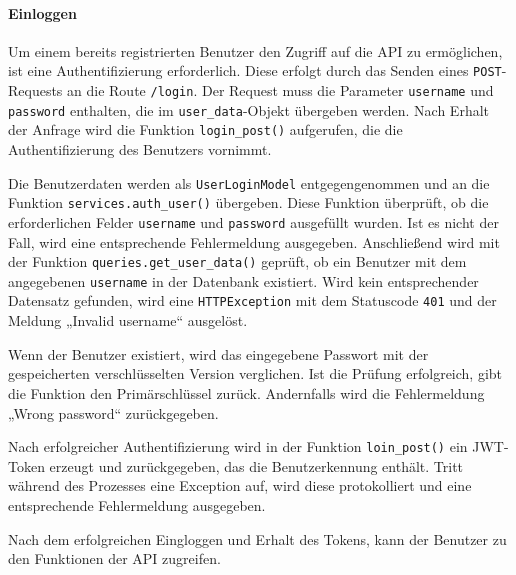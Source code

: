 \documentclass[12pt, letterpaper]{article}
\begin{document}
  \paragraph{Einloggen}
  \par Um einem bereits registrierten Benutzer den Zugriff auf die API zu ermöglichen, ist eine Authentifizierung erforderlich. Diese erfolgt durch das Senden eines \texttt{POST}-Requests an die Route \texttt{/login}. Der Request muss die Parameter \texttt{username} und \texttt{password} enthalten, die im \texttt{user\_data}-Objekt übergeben werden. Nach Erhalt der Anfrage wird die Funktion \texttt{login\_post()} aufgerufen, die die Authentifizierung des Benutzers vornimmt.
  \par Die Benutzerdaten werden als \texttt{UserLoginModel} entgegengenommen und an die Funktion \texttt{services.auth\_user()} übergeben. Diese Funktion überprüft, ob die erforderlichen Felder \texttt{username} und \texttt{password} ausgefüllt wurden. Ist es nicht der Fall, wird eine entsprechende Fehlermeldung ausgegeben. Anschließend wird mit der Funktion \texttt{queries.get\_user\_data()} geprüft, ob ein Benutzer mit dem angegebenen \texttt{username} in der Datenbank existiert. Wird kein entsprechender Datensatz gefunden, wird eine \texttt{HTTPException} mit dem Statuscode \texttt{401} und der Meldung „Invalid username“ ausgelöst.
  \par Wenn der Benutzer existiert, wird das eingegebene Passwort mit der gespeicherten verschlüsselten Version verglichen. Ist die Prüfung erfolgreich, gibt die Funktion den Primärschlüssel zurück. Andernfalls wird die Fehlermeldung „Wrong password“ zurückgegeben.
  \par Nach erfolgreicher Authentifizierung wird in der Funktion \texttt{loin\_post()} ein JWT-Token erzeugt und zurückgegeben, das die Benutzerkennung enthält. Tritt während des Prozesses eine Exception auf, wird diese protokolliert und eine entsprechende Fehlermeldung ausgegeben.
  \par Nach dem erfolgreichen Eingloggen und Erhalt des Tokens, kann der Benutzer zu den Funktionen der API zugreifen. 
\end{document}
